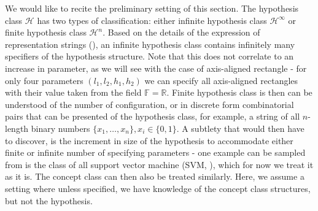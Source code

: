 \documentclass[10pt]{article} %
\begin{document}
We would like to recite the preliminary setting of this section. The hypothesis class $\mathcal{H}$ has two types of classification: either infinite hypothesis class $\mathcal{H}^{\infty}$ or finite hypothesis class $\mathcal{H}^{n}$. Based on the details of the expression of representation strings (\cite{10.5555/200548}), an infinite hypothesis class contains infinitely many specifiers of the hypothesis structure. Note that this does not correlate to an increase in parameter, as we will see with the case of axis-aligned rectangle - for only four parameters $(l_{1},l_{2},h_{1},h_2)$ we can specify all axis-aligned rectangles with their value taken from the field $\mathbb{F}=\mathbb{R}$. Finite hypothesis class is then can be understood of the number of configuration, or in discrete form combinatorial pairs that can be presented of the hypothesis class, for example, a string of all $n$-length binary numbers $\{x_{1},\dots,x_{n}\}, x_{i}\in \{0,1\}$. A subtlety that would then have to discover, is the increment in size of the hypothesis to accommodate either finite or infinite number of specifying parameters - one example can be sampled from is the class of all support vector machine (SVM, \cite{Vapnik1999-VAPTNO}), which for now we treat it as it is. The concept class can then also be treated similarly. Here, we assume a setting where unless specified, we have knowledge of the concept class structures, but not the hypothesis. 
\end{document}
